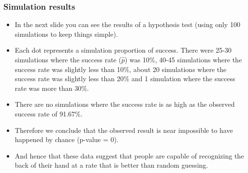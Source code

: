 
\begin{frame}
\frametitle{Simulation results}

\begin{itemize}

\item In the next slide you can see the results of a hypothesis test (using only 100 simulations to keep things simple).

\item Each dot represents a simulation proportion of success. There were 25-30 simulations where the success rate ($\hat{p}$) was 10\%, 40-45 simulations where the success rate was slightly less than 10\%, about 20 simulations where the success rate was slightly less than 20\% and 1 simulation where the success rate was more than 30\%.

\item There are no simulations where the success rate is as high as the observed success rate of 91.67\%.

\item Therefore we conclude that the observed result is near impossible to have happened by chance (p-value = 0).

\item And hence that these data suggest that people are capable of recognizing the back of their hand at a rate that is better than random guessing. 

\end{itemize}

\end{frame}



